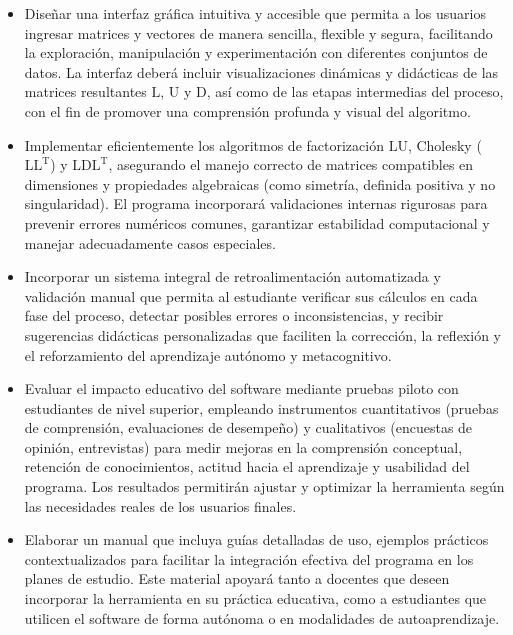 \begin{itemize}
	\item Diseñar una interfaz gráfica intuitiva y accesible que permita a los usuarios ingresar matrices y vectores de manera sencilla, flexible y segura, facilitando la exploración, manipulación y experimentación con diferentes conjuntos de datos. La interfaz deberá incluir visualizaciones dinámicas y didácticas de las matrices resultantes $\mathrm{L}$, $\mathrm{U}$ y $\mathrm{D}$, así como de las etapas intermedias del proceso, con el fin de promover una comprensión profunda y visual del algoritmo.
	
	\item Implementar eficientemente los algoritmos de factorización $\mathrm{LU}$, Cholesky ($\mathrm{LL^T}$) y $\mathrm{LDL^T}$, asegurando el manejo correcto de matrices compatibles en dimensiones y propiedades algebraicas (como simetría, definida positiva y no singularidad). El programa incorporará validaciones internas rigurosas para prevenir errores numéricos comunes, garantizar estabilidad computacional y manejar adecuadamente casos especiales.
	
	\item Incorporar un sistema integral de retroalimentación automatizada y validación manual que permita al estudiante verificar sus cálculos en cada fase del proceso, detectar posibles errores o inconsistencias, y recibir sugerencias didácticas personalizadas que faciliten la corrección, la reflexión y el reforzamiento del aprendizaje autónomo y metacognitivo.
	
	\item Evaluar el impacto educativo del software mediante pruebas piloto con estudiantes de nivel superior, empleando instrumentos cuantitativos (pruebas de comprensión, evaluaciones de desempeño) y cualitativos (encuestas de opinión, entrevistas) para medir mejoras en la comprensión conceptual, retención de conocimientos, actitud hacia el aprendizaje y usabilidad del programa. Los resultados permitirán ajustar y optimizar la herramienta según las necesidades reales de los usuarios finales.
	
	\item Elaborar un manual que incluya guías detalladas de uso, ejemplos prácticos contextualizados para facilitar la integración efectiva del programa en los planes de estudio. Este material apoyará tanto a docentes que deseen incorporar la herramienta en su práctica educativa, como a estudiantes que utilicen el software de forma autónoma o en modalidades de autoaprendizaje.
\end{itemize}

